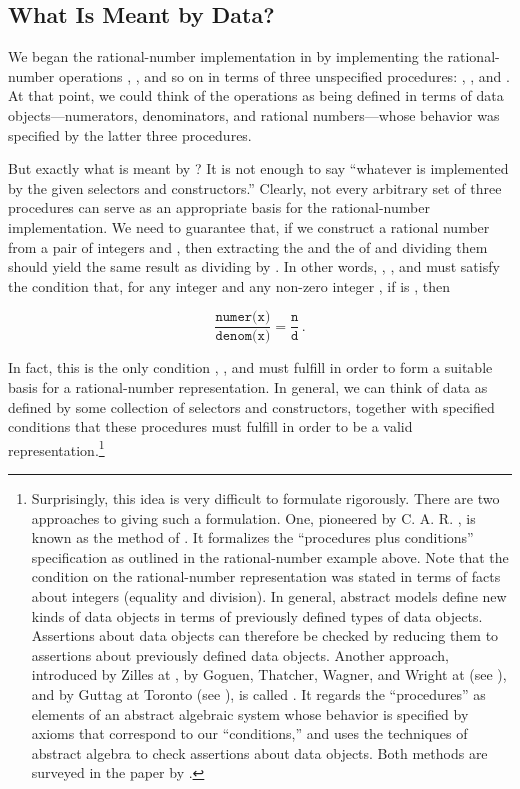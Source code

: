 \subsection{What Is Meant by Data?}
\label{Section 2.1.3}

We began the rational-number implementation in  by
implementing the rational-number operations , , and
so on in terms of three unspecified procedures: , ,
and .  At that point, we could think of the operations as being
defined in terms of data objects---numerators, denominators, and rational
numbers---whose behavior was specified by the latter three procedures.

But exactly what is meant by ?  It is not enough to say
``whatever is implemented by the given selectors and constructors.''  Clearly,
not every arbitrary set of three procedures can serve as an appropriate basis
for the rational-number implementation.  We need to guarantee that, if we
construct a rational number  from a pair of integers  and
, then extracting the  and the  of  and
dividing them should yield the same result as dividing  by .
In other words, , , and  must satisfy
the condition that, for any integer  and any non-zero integer ,
if  is , then

\[
\frac{\texttt{numer(x)}}{\texttt{denom(x)}}
=
\frac{\texttt{n}}{\texttt{d}}\,.
\]

In fact, this is the only condition , , and
 must fulfill in order to form a suitable basis for a
rational-number representation.  In general, we can think of data as defined by
some collection of selectors and constructors, together with specified
conditions that these procedures must fulfill in order to be a valid
representation.\footnote{Surprisingly, this idea is very difficult to formulate
rigorously. There are two approaches to giving such a formulation.  One,
pioneered by C. A. R. , is known as the method of .  It formalizes the ``procedures plus conditions'' specification as
outlined in the rational-number example above.  Note that the condition on the
rational-number representation was stated in terms of facts about integers
(equality and division).  In general, abstract models define new kinds of data
objects in terms of previously defined types of data objects.  Assertions about
data objects can therefore be checked by reducing them to assertions about
previously defined data objects.  Another approach, introduced by Zilles at
, by Goguen, Thatcher, Wagner, and Wright at 
(see ),
and by Guttag at Toronto (see ), is called
.  It regards the ``procedures'' as elements
of an abstract algebraic system whose behavior is specified by axioms that
correspond to our ``conditions,'' and uses the techniques of abstract algebra
to check assertions about data objects.  Both methods are surveyed in the paper
by .}

